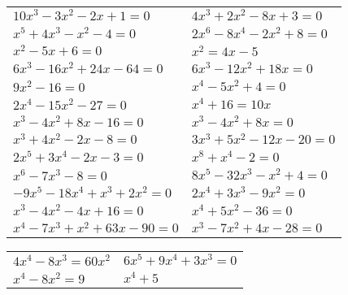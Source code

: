 \documentclass[12pt,a4paper]{article}
\begin{document}
\begin{enumerate}[1.]
\begin{enumerate}[1)]
\begin{tabular}{p{7cm} p{7cm}}
				\item $10x^3-3x^2-2x+1=0$		& \item $4x^3+2x^2-8x+3=0$ \\
				\item $x^5+4x^3-x^2-4=0$		& \item $2x^6-8x^4-2x^2+8=0$ \\
				\item $x^2-5x+6=0$ 				& \item $x^2=4x-5$\\
				\item $6x^3-16x^2+24x-64=0$ 		& \item $6x^3-12x^2+18x=0$\\
				\item $9x^2-16=0$				& \item $x^4-5x^2+4=0$\\
				\item $2x^4-15x^2-27=0 $ 		& \item $x^4+16=10x$\\
				\item $x^3-4x^2+8x-16=0 $ 		& \item $x^3-4x^2+8x=0$\\
				\item $x^3+4x^2-2x-8=0 $ 		& \item $3x^3+5x^2-12x-20=0$\\
				\item $2x^5+3x^4-2x-3=0 $ 		& \item $x^8+x^4-2=0$\\
				\item $x^6-7x^3-8=0 $ 			& \item $8x^5-32x^3-x^2+4=0$\\
				\item $-9x^5-18x^4+x^3+2x^2=0 $ & \item $2x^4+3x^3-9x^2=0$\\
				\item $x^3-4x^2-4x+16=0$ 		& \item $x^4+5x^2-36=0$\\
				\item $x^4-7x^3+x^2+63x-90=0$ 	& \item $x^3 - 7x^2 + 4x - 28 = 0$\\ \end{tabular} \end{enumerate}
			
			
				\begin{enumerate}[1)] \begin{tabular}{p{7cm} p{7cm}} 
				\item $4x^4-8x^3=60x^2$ 	& \vspace{0.4cm}\item $6x^5+9x^4+3x^3=0 $\\
				\item $x^4-8x^2=9 $ 	& \item $x^4+5$\\
				\end{tabular} \end{enumerate}
	\end{enumerate}
\end{document}
